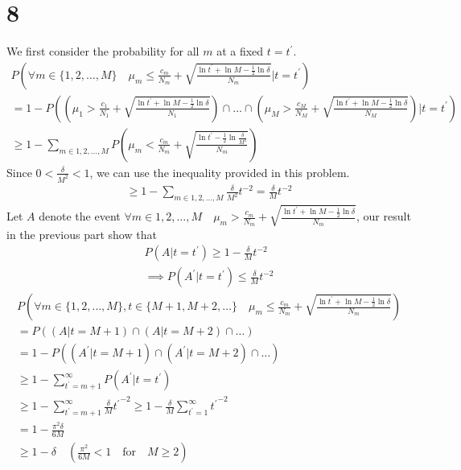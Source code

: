 \documentclass[11pt]{article}
\theoremstyle{definition}
\begin{document}
\section*{8}
We first consider the probability for all $m$ at a fixed $t = t^\prime$.
\begin{gather*}
  P\left(\forall m\in \{1, 2,\dots, M\}\quad \mu_m\leq\frac{c_m}{N_m}+\sqrt{\frac{\ln{t^\prime}+\ln{M} -\frac{1}{2}\ln{\delta}}{N_m}} | t = t^\prime\right) \\ 
  = 1 - P\left((\mu_1 > \frac{c_1}{N_1} + \sqrt{\frac{\ln{t^\prime} + \ln{M} -\frac{1}{2}\ln{\delta}}{N_1}})\cap\dots\cap(\mu_M > \frac{c_M}{N_M} + \sqrt{\frac{\ln{t^\prime} + \ln{M} -\frac{1}{2}\ln{\delta}}{N_M}}) | t = t^\prime\right) \\
  \geq 1 - \sum_{m\in{1, 2,\dots,M}}P\left(\mu_m < \frac{c_m}{N_m} + \sqrt{\frac{\ln{t^\prime} - \frac{1}{2}\ln{\frac{\delta}{M^2}}}{N_m}}\right)
\end{gather*}
Since $0 < \frac{\delta}{M^2} < 1$, we can use the inequality provided in this problem.
\begin{gather*}
  \geq 1 - \sum_{m\in{1, 2,\dots,M}}\frac{\delta}{M^2}t^{-2} = \frac{\delta}{M}t^{-2}
\end{gather*}
Let $A$ denote the event $\forall m \in {1, 2,\dots, M}\quad \mu_m > \frac{c_m}{N_m} + \sqrt{\frac{\ln{t^\prime} + \ln{M} -\frac{1}{2}\ln{\delta}}{N_m}}$, our result in the previous part show that
\begin{gather*}
  P(A | t = t^\prime) \geq 1 - \frac{\delta}{M}t^{-2} \\ 
  \implies P(A^\prime | t = t^\prime) \leq \frac{\delta}{M}t^{-2}
\end{gather*}
\begin{gather*}
  P\left(\forall m\in \{1, 2,\dots, M\}, t \in \{M + 1, M + 2,\dots\} \quad\mu_m\leq\frac{c_m}{N_m}+\sqrt{\frac{\ln{t^\prime}+\ln{M} -\frac{1}{2}\ln{\delta}}{N_m}} \right) \\ 
  = P((A | t = M + 1) \cap (A | t = M + 2) \cap\dots) \\ 
  = 1 - P((A^\prime | t = M + 1) \cap (A^\prime | t = M + 2) \cap\dots) \\
  \geq 1 - \sum_{t^\prime = m + 1}^\infty P(A^\prime | t = t^\prime) \\ 
  \geq 1 - \sum_{t^\prime = m + 1}^\infty \frac{\delta}{M}{t^\prime}^{-2}
  \geq 1 - \frac{\delta}{M} \sum_{t^\prime = 1}^\infty {t^\prime}^{-2} \\ 
  = 1 - \frac{\pi^2\delta}{6M} \\
  \geq 1 - \delta \quad(\frac{\pi^2}{6M} < 1 \quad\text{for}\quad M \geq 2) \\
\end{gather*}
\newpage
\end{document}
